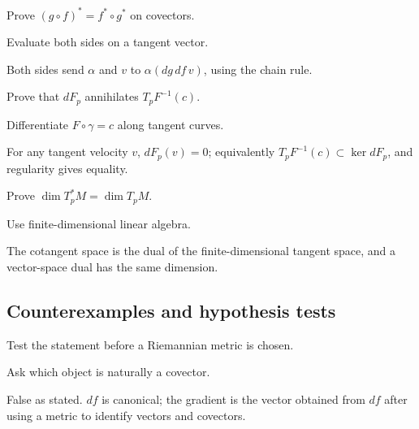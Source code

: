 \begin{exercise}\label{exr:vii05-ped-07}
Prove \((g\circ f)^*=f^*\circ g^*\) on covectors.
\end{exercise}
\begin{hint}
Evaluate both sides on a tangent vector.
\end{hint}
\begin{solution}
Both sides send \(\alpha\) and \(v\) to \(\alpha(dg\,df\,v)\), using the chain rule.
\end{solution}

\begin{exercise}\label{exr:vii05-ped-08}
Prove that \(dF_p\) annihilates \(T_pF^{-1}(c)\).
\end{exercise}
\begin{hint}
Differentiate \(F\circ\gamma=c\) along tangent curves.
\end{hint}
\begin{solution}
For any tangent velocity \(v\), \(dF_p(v)=0\); equivalently \(T_pF^{-1}(c)\subset\ker dF_p\), and regularity gives equality.
\end{solution}

\begin{exercise}\label{exr:vii05-ped-09}
Prove \(\dim T_p^*M=\dim T_pM\).
\end{exercise}
\begin{hint}
Use finite-dimensional linear algebra.
\end{hint}
\begin{solution}
The cotangent space is the dual of the finite-dimensional tangent space, and a vector-space dual has the same dimension.
\end{solution}

\subsection*{Counterexamples and hypothesis tests}

\begin{exercise}\label{exr:vii05-ped-10}
Test the statement before a Riemannian metric is chosen.
\end{exercise}
\begin{hint}
Ask which object is naturally a covector.
\end{hint}
\begin{solution}
False as stated.  \(df\) is canonical; the gradient is the vector obtained from \(df\) after using a metric to identify vectors and covectors.
\end{solution}

